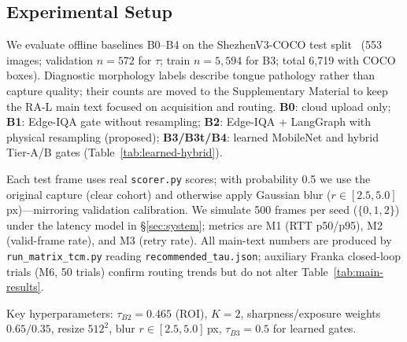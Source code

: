 \subsection{Experimental Setup}
\label{sec:setup}

We evaluate offline baselines B0--B4 on the ShezhenV3-COCO test split~\cite{zhang2020tongue} (553 images; validation $n{=}572$ for $\tau$; train $n{=}5{,}594$ for B3; total 6{,}719 with COCO boxes).
Diagnostic morphology labels describe tongue pathology rather than capture quality; their counts are moved to the Supplementary Material to keep the RA-L main text focused on acquisition and routing.
\textbf{B0}: cloud upload only; \textbf{B1}: Edge-IQA gate without resampling; \textbf{B2}: Edge-IQA + LangGraph with physical resampling (proposed); \textbf{B3/B3t/B4}: learned MobileNet and hybrid Tier-A/B gates (Table~\ref{tab:learned-hybrid}).

Each test frame uses real \texttt{scorer.py} scores; with probability 0.5 we use the original capture (clear cohort) and otherwise apply Gaussian blur ($r\in[2.5,5.0]$\,px)---mirroring validation calibration.
We simulate 500 frames per seed ($\{0,1,2\}$) under the latency model in \S\ref{sec:system}; metrics are M1 (RTT p50/p95), M2 (valid-frame rate), and M3 (retry rate).
All main-text numbers are produced by \texttt{run\_matrix\_tcm.py} reading \texttt{recommended\_tau.json}; auxiliary Franka closed-loop trials (M6, 50 trials) confirm routing trends but do not alter Table~\ref{tab:main-results}.

Key hyperparameters: $\tau_{B2}{=}0.465$ (ROI), $K{=}2$, sharpness/exposure weights $0.65/0.35$, resize $512^2$, blur $r\in[2.5,5.0]$\,px, $\tau_{B3}{=}0.5$ for learned gates.
